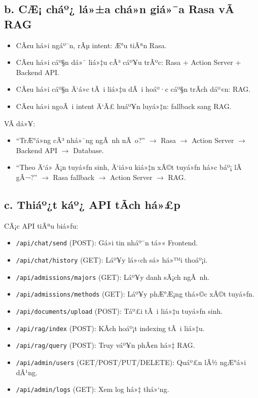 ﻿\documentclass[12pt,a4paper]{report}
\begin{document}
\subsection*{b. CÆ¡ cháº¿ lá»±a chá»n giá»¯a Rasa vÃ  RAG}

\begin{itemize}
    \item CÃ¢u há»i ngáº¯n, rÃµ intent: Æ°u tiÃªn Rasa.
    \item CÃ¢u há»i cáº§n dá»¯ liá»‡u cÃ³ cáº¥u trÃºc: Rasa + Action Server + Backend API.
    \item CÃ¢u há»i cáº§n Ä‘á»c tÃ i liá»‡u dÃ i hoáº·c cáº§n trÃ­ch dáº«n: RAG.
    \item CÃ¢u há»i ngoÃ i intent Ä‘Ã£ huáº¥n luyá»‡n: fallback sang RAG.
\end{itemize}

VÃ­ dá»¥:
\begin{itemize}
    \item ``TrÆ°á»ng cÃ³ nhá»¯ng ngÃ nh nÃ o?'' $\rightarrow$ Rasa $\rightarrow$ Action Server $\rightarrow$ Backend API $\rightarrow$ Database.
    \item ``Theo Ä‘á» Ã¡n tuyá»ƒn sinh, Ä‘iá»u kiá»‡n xÃ©t tuyá»ƒn há»c báº¡ lÃ  gÃ¬?'' $\rightarrow$ Rasa fallback $\rightarrow$ Action Server $\rightarrow$ RAG.
\end{itemize}

\subsection*{c. Thiáº¿t káº¿ API tÃ­ch há»£p}

CÃ¡c API tiÃªu biá»ƒu:
\begin{itemize}
    \item \texttt{/api/chat/send} (POST): Gá»­i tin nháº¯n tá»« Frontend.
    \item \texttt{/api/chat/history} (GET): Láº¥y lá»‹ch sá»­ há»™i thoáº¡i.
    \item \texttt{/api/admissions/majors} (GET): Láº¥y danh sÃ¡ch ngÃ nh.
    \item \texttt{/api/admissions/methods} (GET): Láº¥y phÆ°Æ¡ng thá»©c xÃ©t tuyá»ƒn.
    \item \texttt{/api/documents/upload} (POST): Táº£i tÃ i liá»‡u tuyá»ƒn sinh.
    \item \texttt{/api/rag/index} (POST): KÃ­ch hoáº¡t indexing tÃ i liá»‡u.
    \item \texttt{/api/rag/query} (POST): Truy váº¥n phÃ¢n há»‡ RAG.
    \item \texttt{/api/admin/users} (GET/POST/PUT/DELETE): Quáº£n lÃ½ ngÆ°á»i dÃ¹ng.
    \item \texttt{/api/admin/logs} (GET): Xem log há»‡ thá»‘ng.
\end{itemize}
\end{document}
